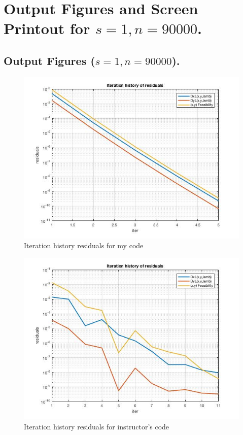 \clearpage
\section{Output Figures and Screen Printout for $s=1,n=90000$.}
\subsection{Output Figures ($s=1,n=90000$).}
\begin{figure}[H]
\centering
\includegraphics[width=12cm]{F_9/F_1_2.jpg}
\caption{Iteration history residuals for my code}
\end{figure}
\begin{figure}[H]
\centering
\includegraphics[width=12cm]{F_9/F_1_3.jpg}
\caption{Iteration history residuals for instructor's code}
\end{figure}


